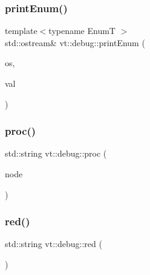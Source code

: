 \mbox{\label{namespacevt_1_1debug_afaa2c8383e718071689dfea2c959a467}} 
\subsubsection{\texorpdfstring{print\+Enum()}{printEnum()}}
{\footnotesize\ttfamily template$<$typename EnumT $>$ \\
std\+::ostream\& vt\+::debug\+::print\+Enum (\begin{DoxyParamCaption}\item[{std\+::ostream \&}]{os,  }\item[{EnumT const \&}]{val }\end{DoxyParamCaption})\hspace{0.3cm}{\ttfamily [inline]}}

\mbox{\label{namespacevt_1_1debug_a13a11e278ff8e5a4093396437511aeb7}} 
\subsubsection{\texorpdfstring{proc()}{proc()}}
{\footnotesize\ttfamily std\+::string vt\+::debug\+::proc (\begin{DoxyParamCaption}\item[{\hyperlink{namespacevt_a866da9d0efc19c0a1ce79e9e492f47e2}{vt\+::\+Node\+Type} const \&}]{node }\end{DoxyParamCaption})\hspace{0.3cm}{\ttfamily [inline]}}

\mbox{\label{namespacevt_1_1debug_a6b162f2ca1d964d7cf05c4079d5554a0}} 
\subsubsection{\texorpdfstring{red()}{red()}}
{\footnotesize\ttfamily std\+::string vt\+::debug\+::red (\begin{DoxyParamCaption}{ }\end{DoxyParamCaption})\hspace{0.3cm}{\ttfamily [inline]}}


